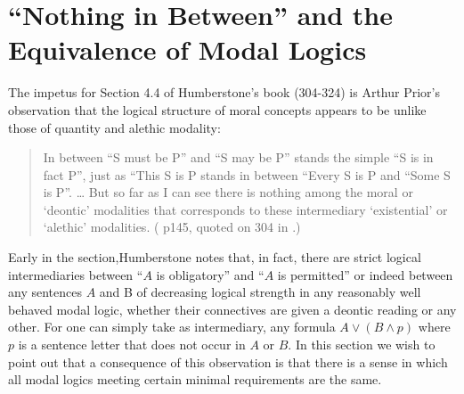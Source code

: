 \documentclass[11pt]{article}
\begin{document}
\section{``Nothing in Between'' and the Equivalence of Modal Logics}
The impetus for Section 4.4 of Humberstone's book (304-324) is Arthur Prior's observation that the logical structure of moral concepts appears to be unlike those of quantity and alethic modality:
\begin{quote} In between ``S must be P'' and ``S may be P'' stands the simple ``S is in fact P'', just as ``This S is P stands in between ``Every S is P and ``Some S is P''. {\ldots} But so far as I can see there is nothing among the moral or `deontic' modalities that corresponds to these intermediary `existential' or `alethic' modalities. (\citet{prior1951ethical} p145, quoted on 304 in \citet{Humberstone2016}.)
\end{quote}
Early in the section,\footnotemark{ }Humberstone notes that, in fact, there are strict logical intermediaries between ``$A$ is obligatory'' and ``$A$ is permitted'' or indeed between any sentences $A$ and B of decreasing logical strength in any reasonably well behaved modal logic, whether their connectives are given a deontic reading or any other. For one can simply take as intermediary, any formula $A\vee (B\wedge p)$ where $p$ is a sentence letter that does not occur in $A$ or $B$. In this section we wish to point out that a consequence of this observation is that there is a sense in which all modal logics meeting certain minimal requirements are the same. 
\end{document}
